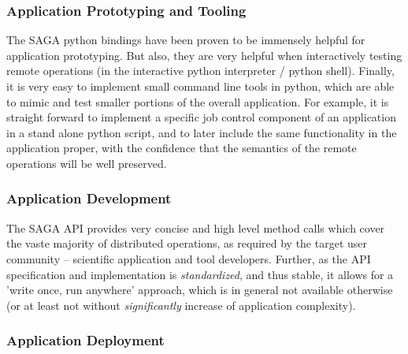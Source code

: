 \documentclass[12pt]{article}
\newcommand{\I}[1]{\textit{#1}}
\begin{document}
  \subsubsection*{Application Prototyping and Tooling}

   The SAGA python bindings have been proven to be immensely helpful
   for application prototyping.  But also, they are very helpful when
   interactively testing remote operations (in the interactive python
   interpreter / python shell).  Finally, it is very easy to implement
   small command line tools in python, which are able to mimic and
   test smaller portions of the overall application.  For example, it
   is straight forward to implement a specific job control component
   of an application in a stand alone python script, and to later
   include the same functionality in the application proper, with the
   confidence that the semantics of the remote operations will be well
   preserved. %


  \subsubsection*{Application Development}


  The SAGA API provides very concise and high level method calls which
  cover the vaste majority of distributed operations, as required by
  the target user community -- scientific application and tool
  developers.  Further, as the API specification and implementation is
  \I{standardized}, and thus stable, it allows for a 'write once, run
  anywhere' approach, which is in general not available otherwise (or
  at least not without \I{significantly} increase of application
  complexity).

 \subsubsection*{Application Deployment}
\end{document}
